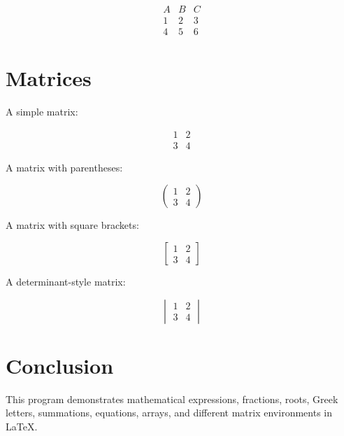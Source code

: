 \documentclass[12pt,a4paper]{article}
\begin{document}
\[
\begin{array}{c|c|c}
A & B & C \\
\hline
1 & 2 & 3 \\
4 & 5 & 6
\end{array}
\]

\section{Matrices}

A simple matrix:

\[
\begin{matrix}
1 & 2 \\
3 & 4
\end{matrix}
\]

A matrix with parentheses:

\[
\begin{pmatrix}
1 & 2 \\
3 & 4
\end{pmatrix}
\]

A matrix with square brackets:

\[
\begin{bmatrix}
1 & 2 \\
3 & 4
\end{bmatrix}
\]

A determinant-style matrix:

\[
\begin{vmatrix}
1 & 2 \\
3 & 4
\end{vmatrix}
\]

\section{Conclusion}

This program demonstrates mathematical expressions,
fractions, roots, Greek letters, summations, equations,
arrays, and different matrix environments in LaTeX.
\end{document}
